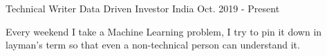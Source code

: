 \begin{cventries}
  \cventry
    {Technical Writer}
    {Data Driven Investor}
    {India}
    {Oct. 2019 - Present}
    {
      \begin{cvitems}
        \item {Every weekend I take a Machine Learning problem, I try to pin it down in layman's term so that even a non-technical person can understand it.}
      \end{cvitems}
    }
\end{cventries}
